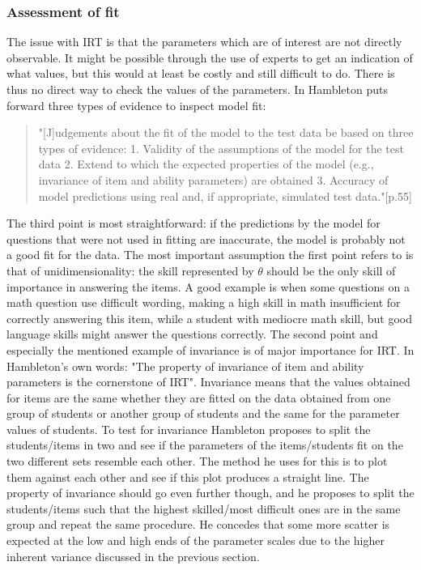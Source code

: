 \documentclass{scrartcl}
\begin{document}
\subsubsection{Assessment of fit}
The issue with IRT is that the parameters which are of interest are not directly observable. It might be possible through the use of experts to get an indication of what values, but this would at least be costly and still difficult to do. There is thus no direct way to check the values of the parameters. In \cite{hambleton} Hambleton puts forward three types of evidence to inspect model fit:

\begin{quote}"[J]udgements about the fit of the model to the test data be based on three types of evidence: 1. Validity of the assumptions of the model for the test data 2. Extend to which the expected properties of the model (e.g., invariance of item and ability parameters) are obtained 3. Accuracy of model predictions using real and, if appropriate, simulated test data."[p.55]
\end{quote}

The third point is most straightforward: if the predictions by the model for questions that were not used in fitting are inaccurate, the model is probably not a good fit for the data. The most important assumption the first point refers to is that of unidimensionality: the skill represented by $\theta$ should be the only skill of importance in answering the items. A good example is when some questions on a math question use difficult wording, making a high skill in math insufficient for correctly answering this item, while a student with mediocre math skill, but good language skills might answer the questions correctly. The second point and especially the mentioned example of invariance is of major importance for IRT. In Hambleton's own words: "The property of invariance of item and ability parameters is the cornerstone of IRT". Invariance means that the values obtained for items are the same whether they are fitted on the data obtained from one group of students or another group of students and the same for the parameter values of students. To test for invariance Hambleton proposes to split the students/items in two and see if the parameters of the items/students fit on the two different sets resemble each other. The method he uses for this is to plot them against each other and see if this plot produces a straight line. The property of invariance should go even further though, and he proposes to split the students/items such that the highest skilled/most difficult ones are in the same group and repeat the same procedure. He concedes that some more scatter is expected at the low and high ends of the parameter scales due to the higher inherent variance discussed in the previous section.
\end{document}
